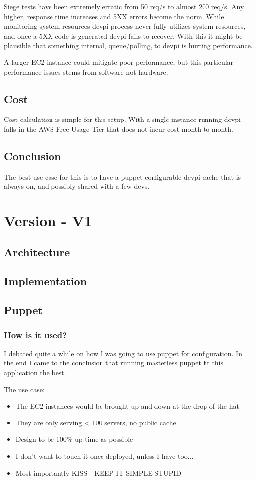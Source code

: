 \documentclass[12pt, letterpaper]{article}
\begin{document}
Siege tests have been extremely erratic from 50 req/s to almost 200 req/s. Any higher, response time increases and 5XX errors become
the norm. While monitoring system resources devpi process never fully utilizes system resources, and once a 5XX code is generated 
devpi fails to recover. With this it might be plausible that something internal, queue/polling, to devpi is hurting performance.

A larger EC2 instance could mitigate poor performance, but this particular performance issues stems from software not hardware.

\subsection{Cost}
Cost calculation is simple for this setup. With a single instance running devpi falls in the AWS Free Usage Tier that does
not incur cost month to month.

\subsection{Conclusion}
The best use case for this is to have a puppet configurable devpi cache that is always on, and possibly shared with a few devs. 

\section{Version - V1}

\subsection{Architecture}

\subsection{Implementation}

\subsection{Puppet}
\subsubsection{How is it used?}
I debated quite a while on how I was going to use puppet for configuration. In the end I came to the conclusion that
running masterless puppet fit this application the best.  

The use case:
\begin{itemize}
    \item The EC2 instances would be brought up and down at the drop of the hat
    \item They are only serving < 100 servers, no public cache
    \item Design to be 100\% up time as possible 
    \item I don't want to touch it once deployed, unless I have too... 
    \item Most importantly KISS - KEEP IT SIMPLE STUPID
\end{itemize}
\end{document}
